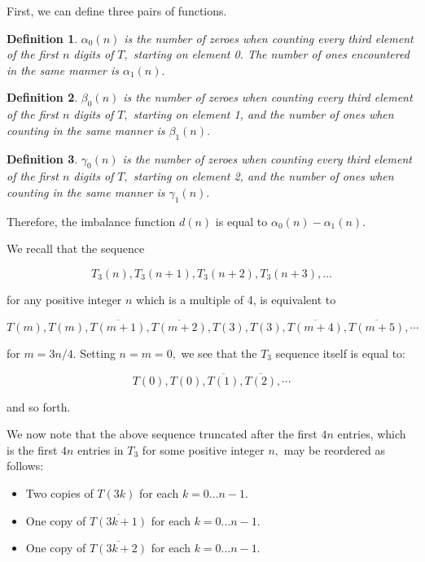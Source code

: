 \documentclass{article}
\newtheorem{definition}{Definition}[section]
\begin{document}
First, we can define three pairs of functions.

\begin{definition}
$\alpha_0(n)$ is the number of zeroes when counting every third element of the first $n$ digits of $T,$ starting on element 0. The number of ones encountered in the same manner is $\alpha_1(n).$
\end{definition}

\begin{definition}
$\beta_0(n)$ is the number of zeroes when counting every third element of the first $n$ digits of $T,$ starting on element 1, and the number of ones when counting in the same manner is $\beta_1(n).$
\end{definition}

\begin{definition}
$\gamma_0(n)$ is the number of zeroes when counting every third element of the first $n$ digits of $T,$ starting on element 2, and the number of ones when counting in the same manner is $\gamma_1(n).$
\end{definition}

Therefore, the imbalance function $d(n)$ is equal to $\alpha_0(n) - \alpha_1(n).$

We recall that the sequence

$$T_3(n), T_3(n+1), T_3(n+2), T_3(n+3), ...$$

for any positive integer $n$ which is a multiple of 4, is equivalent to

$$T(m), T(m), \overline{T(m+1)}, \overline{T(m+2)}, T(3), T(3), \overline{T(m+4)}, \overline{T(m+5)}, \cdots$$

for $m = 3n/4.$ Setting $n = m = 0,$ we see that the $T_3$ sequence itself is equal to:

$$T(0), T(0), \overline{T(1)}, \overline{T(2)}, \cdots$$

and so forth.

We now note that the above sequence truncated after the first $4n$ entries, which is the first $4n$ entries in $T_3$ for some positive integer $n,$ may be reordered as follows:

\begin{itemize}
\label{reorder}
\item Two copies of $T(3k)$ for each $k = 0 ... n - 1.$
\item One copy of $\overline{T(3k+1)}$ for each $k = 0 ... n - 1.$
\item One copy of $\overline{T(3k+2)}$ for each $k = 0 ... n - 1.$
\end{itemize}
\end{document}
